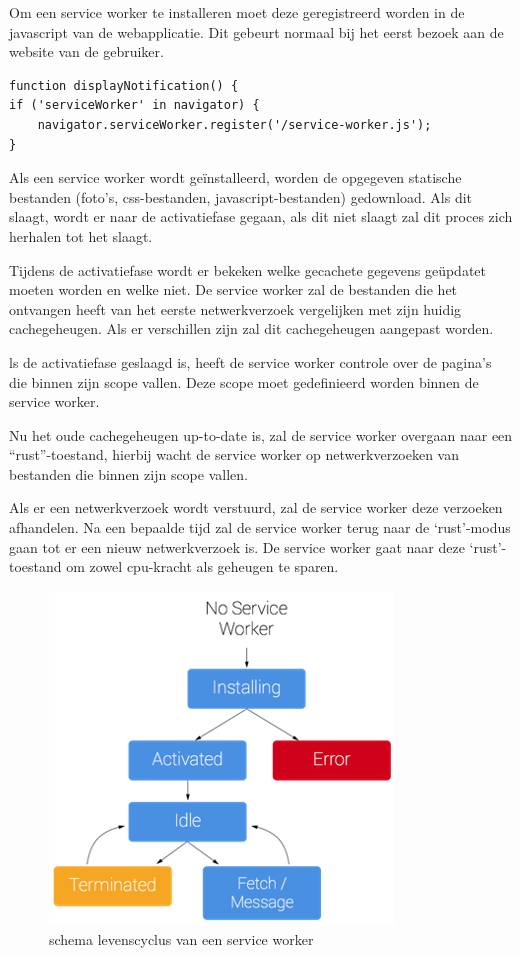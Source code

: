 			Om een service worker te installeren moet deze geregistreerd worden in de javascript van de webapplicatie. Dit gebeurt normaal bij het eerst bezoek aan de website van de gebruiker.
			
\begin{lstlisting}
function displayNotification() {
if ('serviceWorker' in navigator) {
	navigator.serviceWorker.register('/service-worker.js');
}
\end{lstlisting}
	
		Als een service worker wordt geïnstalleerd, worden de opgegeven statische bestanden (foto’s, css-bestanden, javascript-bestanden) gedownload. Als dit slaagt, wordt er naar de activatiefase gegaan, als dit niet slaagt zal dit proces zich herhalen tot het slaagt. 
		
		Tijdens de activatiefase wordt er bekeken welke gecachete gegevens geüpdatet moeten worden en welke niet. De service worker zal de bestanden die het ontvangen heeft van het eerste netwerkverzoek vergelijken met zijn huidig cachegeheugen. Als er verschillen zijn zal dit cachegeheugen aangepast worden.
		
		ls de activatiefase geslaagd is, heeft de service worker controle over de pagina’s die binnen zijn scope vallen. Deze scope moet gedefinieerd worden binnen de service worker.
		
		Nu het oude cachegeheugen up-to-date is, zal de service worker overgaan naar een “rust”-toestand, hierbij wacht de service worker op netwerkverzoeken van bestanden die binnen zijn scope vallen.
		
		Als er een netwerkverzoek wordt verstuurd, zal de service worker deze verzoeken afhandelen. Na een bepaalde tijd zal de service worker terug naar de ‘rust’-modus gaan tot er een nieuw netwerkverzoek is. De service worker gaat naar deze ‘rust’-toestand om zowel cpu-kracht als geheugen te sparen.
		\autocite{Gaunt2019}
		
		
		\begin{figure}[H]
			\centering
			\includegraphics{./img/ServiceWorkerLifeCycle.png}
			\caption{schema levenscyclus van een service worker \autocite{Gaunt2019}}
		\end{figure}
	

